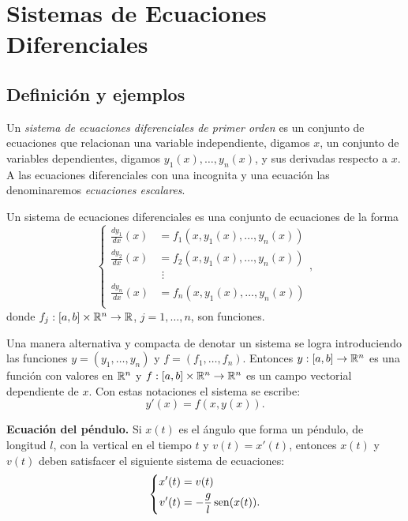 \section{Sistemas de Ecuaciones Diferenciales}
\subsection{Definición y ejemplos}
Un \emph{sistema de ecuaciones diferenciales de primer orden} es un conjunto  de ecuaciones que relacionan una variable independiente, digamos $x$, un conjunto de variables dependientes, digamos $y_1(x),\ldots,y_n(x)$, y sus derivadas respecto a $x$. A las ecuaciones diferenciales con una incognita y una ecuación las denominaremos \emph{ecuaciones escalares}.

\begin{definicion} Un sistema de ecuaciones diferenciales es una conjunto de ecuaciones de la forma
\begin{equation}\label{eq:sist_ecua}
\left\{
\begin{split}
 \frac{dy_1}{dx}(x)&=f_1(x,y_1(x),\ldots,y_n(x))\\
  \frac{dy_2}{dx}(x)&=f_2(x,y_1(x),\ldots,y_n(x))\\
       &\,\,\vdots                                   \\
 \frac{dy_n}{dx}(x)&=f_n(x,y_1(x),\ldots,y_n(x))\\
\end{split}\right.,
\end{equation}
donde $f_j:[a,b]\times\mathbb{R}^n\to\mathbb{R}$, $j=1,\ldots,n$, son funciones.

Una manera alternativa y compacta de denotar un sistema se logra introduciendo las funciones $y=(y_1,\ldots,y_n)$  y $f=(f_1,\ldots,f_n)$. Entonces $y:[a,b]\to\mathbb{R}^n$ es una función con valores en $\mathbb{R}^n$ y $f:[a,b]\times \mathbb{R}^n\to\mathbb{R}^n$ es un campo vectorial dependiente de $x$. Con estas notaciones el sistema se escribe:
\begin{equation}\label{eq:sist_ecua_comp}
 y'(x)=f(x,y(x)).
\end{equation}

\end{definicion}






\begin{ejemplo} \textbf{Ecuación del péndulo.} Si $x(t)$ es el ángulo que forma un péndulo, de longitud $l$, con la vertical en el tiempo $t$ y $v(t)=x'(t)$, entonces $x(t)$ y$v(t)$ deben satisfacer el siguiente sistema de  ecuaciones:
\begin{equation}\label{eq:sist_pend}
\left\{
\begin{split}
 x'(t)&=v(t)\\
  v'(t)&=-\frac{g}{l}\operatorname{sen}(x(t)).\\
\end{split}\right.
\end{equation}


\end{ejemplo}


